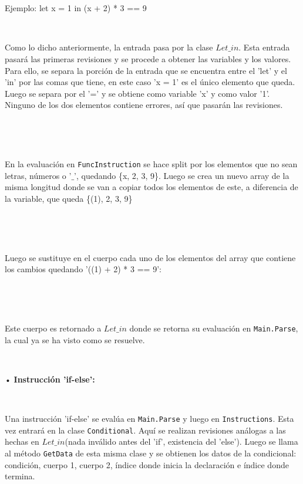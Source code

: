 \documentclass{article}
\begin{document}
\ 




\


Ejemplo: let x = 1 in (x + 2) * 3 == 9


\ 


Como lo dicho anteriormente, la entrada pasa por la clase {\texttt{$Let\_in$}}. Esta entrada pasará las primeras revisiones
y se procede a obtener las variables y los valores. Para ello, se separa la porción de la entrada que se encuentra entre
el 'let' y el 'in' por las comas que tiene, en este caso 'x = 1' es el único elemento que queda. Luego se separa por
el '=' y se obtiene como variable 'x' y como valor '1'. Ninguno de los dos elementos contiene errores, así que pasarán 
las revisiones. 


\ 





\


En la evaluación en {\texttt{FuncInstruction}} se hace split por los elementos que no sean letras, números o '$\_$', quedando 
\{x, 2, 3, 9\}. Luego se crea un nuevo array de la misma longitud donde se van a copiar todos los elementos de este, a diferencia
de la variable, que queda \{(1), 2, 3, 9\}


\ 




\


Luego se sustituye en el cuerpo cada uno de los elementos del array que contiene los cambios quedando '((1) + 2) * 3 == 9': 


\ 





\


Este cuerpo es retornado a {\texttt{$Let\_in$}} donde se retorna su evaluación en {\texttt{Main.Parse}}, la cual ya se ha visto como 
se resuelve.


\ 


• \textbf{Instrucción 'if-else':}

\


Una instrucción 'if-else' se evalúa en {\texttt{Main.Parse}} y luego en {\texttt{Instructions}}. Esta vez entrará en la
clase {\texttt{Conditional}}. Aquí se realizan revisiones análogas a las hechas en {\texttt{$Let\_in$}}(nada inválido
antes del 'if', existencia del 'else'). Luego se llama al método {\texttt{GetData}} de esta misma clase y se obtienen
los datos de la condicional: condición, cuerpo 1, cuerpo 2, índice donde inicia la declaración e índice donde termina.
\end{document}
